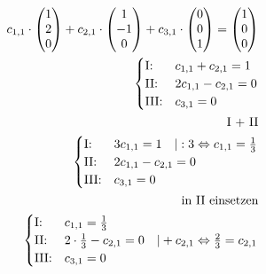 \begin{align*}
    c_{1,1} \cdot \begin{pmatrix}
        1 \\ 2 \\ 0
    \end{pmatrix} + c_{2, 1} \cdot \begin{pmatrix}
        1 \\ -1 \\ 0
    \end{pmatrix} + c_{3, 1} \cdot \begin{pmatrix}
        0 \\ 0 \\ 1
    \end{pmatrix} = \begin{pmatrix}
        1 \\ 0 \\ 0
    \end{pmatrix} \\
    \begin{cases}
        \text{I:\@} & c_{1,1} + c_{2,1} = 1 \\
        \text{II:\@} & 2c_{1,1} - c_{2,1} = 0 \\
        \text{III:\@} & c_{3,1} = 0
    \end{cases} \\
    \text{I + II} \\ 
    \begin{cases}
        \text{I:\@} & 3c_{1,1}  = 1 \quad | : 3 \Leftrightarrow c_{1,1} = \frac{1}{3}\\
        \text{II:\@} & 2c_{1,1} - c_{2,1} = 0 \\
        \text{III:\@} & c_{3,1} = 0
    \end{cases} \\
    \text{in II einsetzen} \\
    \begin{cases}
        \text{I:\@} & c_{1,1} = \frac{1}{3}\\
        \text{II:\@} & 2 \cdot \frac{1}{3} - c_{2, 1} = 0 \quad | +c_{2, 1} \Leftrightarrow \frac{2}{3} = c_{2, 1}  \\
        \text{III:\@} & c_{3,1} = 0
    \end{cases} \\
\end{align*}

